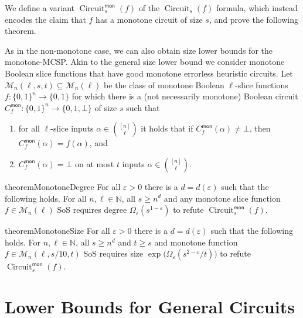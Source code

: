 \documentclass[10pt,a4paper]{article}
\theoremstyle{plain}
\theoremstyle{remark}
\theoremstyle{definition}
\newcommand{\eps}{\varepsilon}
\newcommand{\set}[1]{\{#1\}}
\newcommand{\calM}{\mathcal{M}}
\newcommand{\N}{\mathbb{N}}
\newcommand{\mon}{{\mathsf{mon}}}
\DeclareMathOperator{\circuit}{Circuit}
\begin{document}
We define a variant $\circuit_s^{\mon}(f)$ of the $\circuit_s(f)$
formula, which instead encodes the claim that $f$ has a monotone
circuit of size $s$, and prove the following theorem.

As in the non-monotone case, we can also obtain size lower bounds for
the monotone-MCSP. Akin to the general size lower bound we consider
monotone Boolean slice functions that have good monotone errorless
heuristic circuits. Let $\calM_n(\ell, s, t) \subseteq \calM_n(\ell)$
be the class of monotone Boolean $\ell$-slice functions
$f: \set{0,1}^n \rightarrow \set{0,1}$ for which there is a
(not necessarily monotone) Boolean circuit
$C_f^\mon: \set{0,1}^n \rightarrow \set{0,1, \bot}$ of size $s$ such
that
\begin{enumerate}
\item for all $\ell$-slice inputs $\alpha \in \binom{[n]}{\ell}$ it
  holds that if $C^\mon_f(\alpha) \neq \bot$, then
  $C^\mon_f(\alpha) = f(\alpha)$, and
\item $C^\mon_f(\alpha) = \bot$ on at most $t$ inputs
  $\alpha \in \binom{[n]}{\ell}$.
\end{enumerate}

\begin{restatable}{theorem}{MonotoneDegree}
  \label{thm:main-monotone-degree}
  For all $\eps > 0$ there is a $d = d(\eps)$ such that the following
  holds.  For all $n, \ell \in \N$, all $s \ge n^{d}$ and any monotone
  slice function $f \in \calM_n(\ell)$ SoS requires degree
  $\Omega_\eps(s^{1-\eps})$ to refute
  $\circuit_s^{\mon}(f)$.
\end{restatable}

\begin{restatable}{theorem}{MonotoneSize}
  \label{thm:main-monotone-size}
  For all $\eps > 0$ there is a $d = d(\eps)$ such that the following
  holds.  For $n, \ell \in \N$, all $s \ge n^{d}$ and $t \ge s$ and
  monotone function $f \in \calM_n(\ell, s/10, t)$ SoS requires size
  $\exp\big(\Omega_\eps(s^{2-\eps}/t)\big)$ to refute
  $\circuit_s^{\mon}(f)$.
\end{restatable}

\section{Lower Bounds for General Circuits}
\label{sec:demorgan-LB}
\end{document}
